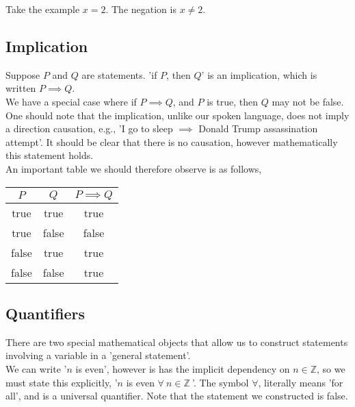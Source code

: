 \documentclass{article}
\begin{document}
            Take the example $x=2$. The negation is $x\neq 2$.

        \subsection{Implication}
            Suppose $P$ and $Q$ are statements. 'if $P$, then $Q$' is an implication, which is written $P \implies Q$.\\

            We have a special case where if $P \implies Q$, and $P$ is true, then $Q$ may not be false. One should note that the implication, unlike our spoken language, does not imply a direction causation, e.g., 'I go to sleep $\implies$ Donald Trump assassination attempt'. It should be clear that there is no causation, however mathematically this statement holds.\\

            An important table we should therefore observe is as follows,

            \begin{center}
                \begin{tabular}{|c|c|c|}
                    \hline
                    $P$ & $Q$ & $P \implies Q$ \\
                    \hline
                    true & true & true \\
                    true & false & false \\
                    false & true & true \\
                    false & false & true \\
                    \hline
                \end{tabular}
            \end{center}

        \subsection{Quantifiers}
            There are two special mathematical objects that allow us to construct statements involving a variable in a 'general statement'.\\

            We can write '$n$ is even', however is has the implicit dependency on $n\in\mathbb{Z}$, so we must state this explicitly, '$n$ is even $\forall ~n \in \mathbb{Z}~$'. The symbol $\forall$, literally means 'for all', and is a universal quantifier. Note that the statement we constructed is false. 
\end{document}
